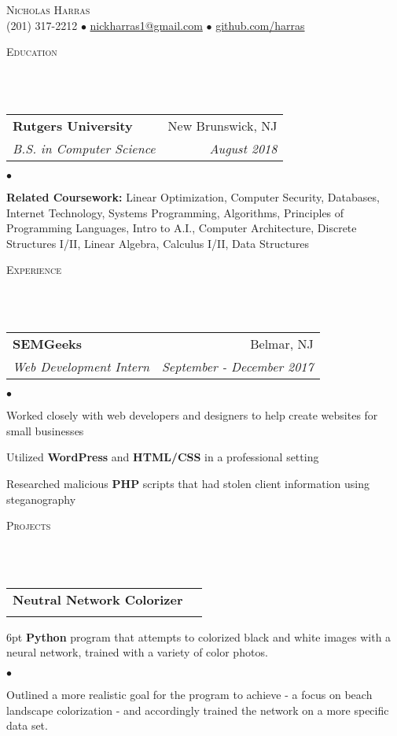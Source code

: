 \documentclass[12pt]{article}
\makeatletter
\newcommand{\lineunder}{
	\vspace*{-8pt} \\ 
	\hspace*{-18pt} 
	\hrulefill \\
}
\newcommand{\header}[1]{
	\vspace*{2pt}
	{\hspace*{-14pt}\vspace*{6pt} \textsc{#1}} 
	\vspace*{-6pt} 
	\lineunder
}
\newcommand{\contact}[2]{
	\vspace*{-8pt}
	\begin{center}
		{\LARGE \scshape {#1}}\\
		#2
	\end{center}
	\vspace*{-8pt}
}
\newenvironment{achievements}{
  \begin{list}{$\bullet$}{
  	\topsep 0pt \itemsep -4pt}}
  	{\vspace*{2pt}\end{list}
}
\newcommand{\mailto}[1]{
	\href{mailto:#1}{#1}}
\newcommand{\subheading}[4]{
 	\vspace{5pt}
    	\begin{tabular*}{1.01\textwidth}{l@{\extracolsep{\fill}}r}
      		\textbf{#1} & #2 \\
      		\textit{\small#3} & \textit{\small #4} \\
    	\end{tabular*}\vspace{-5pt}
}
\makeatother
\begin{document}
\small
\smallskip
\vspace*{-44pt}

\contact{Nicholas Harras}{(201) 317-2212 $\bullet$ \mailto{nickharras1@gmail.com} $\bullet$ \href{https://www.github.com/harras}{github.com/harras}}

\header{Education}

\subheading
	{Rutgers University}{New Brunswick, NJ}
	{B.S. in Computer Science}{August 2018}
	\begin{achievements}	
	\item{\bf Related Coursework:} Linear Optimization, Computer Security, Databases, Internet Technology, Systems Programming, Algorithms, Principles of Programming Languages, Intro to A.I., Computer Architecture, Discrete Structures I/II, Linear Algebra, Calculus I/II, Data Structures
	\end{achievements}

\header{Experience}

\subheading
	{SEMGeeks}{Belmar, NJ}
	{Web Development Intern}{September - December 2017}
	\begin{achievements}
		\item Worked closely with web developers and designers to help create websites for small businesses
		\item Utilized \textbf{WordPress} and \textbf{HTML/CSS} in a professional setting
		\item Researched malicious \textbf{PHP} scripts that had stolen client information using steganography
	\end{achievements}


\header{Projects}

\subheading{Neutral Network Colorizer}{}{}{}
	\vspace{-15pt}
	\begin{adjustwidth}{6pt}{}
	\textbf{Python} program that attempts to colorized black and white images with a neural network, trained with a variety of color photos.
	\end{adjustwidth}
	\begin{achievements}
		\item Outlined a more realistic goal for the program to achieve - a focus on beach landscape colorization - and accordingly trained the network on a more specific data set. 
	\end{achievements}
	
\end{document}
